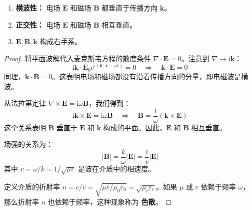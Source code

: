 \documentclass[fontset=none]{ctexart}
\begin{document}
\begin{theorem}[平面电磁波的性质]
\begin{enumerate}
    \item \textbf{横波性：} 电场 $\bm{E}$ 和磁场 $\bm{B}$ 都垂直于传播方向 $\bm{k}$。
    \item \textbf{正交性：} 电场 $\bm{E}$ 和磁场 $\bm{B}$ 相互垂直。
    \item $\bm{E}, \bm{B}, \bm{k}$ 构成右手系。
\end{enumerate}
\end{theorem}
\begin{proof}
将平面波解代入麦克斯韦方程的散度条件 $\nabla \cdot \bm{E}=0$。注意到 $\nabla \to \mathrm{i}\bm{k}$：
\begin{equation}
\mathrm{i}\bm{k} \cdot \bm{E}_0 \mathrm{e}^{\mathrm{i}(\bm{k} \cdot \bm{r} - \omega t)} = 0 \quad \Rightarrow \quad \bm{k} \cdot \bm{E} = 0
\end{equation}
同理，$\bm{k} \cdot \bm{B} = 0$。这表明电场和磁场都没有沿着传播方向的分量，即电磁波是横波。

从法拉第定律 $\nabla \times \bm{E} = \mathrm{i}\omega\bm{B}$，我们得到：
\begin{equation}
\mathrm{i}\bm{k} \times \bm{E} = \mathrm{i}\omega\bm{B} \quad \Rightarrow \quad \bm{B} = \frac{1}{\omega}(\bm{k} \times \bm{E})
\end{equation}
这个关系表明 $\bm{B}$ 垂直于 $\bm{E}$ 和 $\bm{k}$ 构成的平面。因此，$\bm{E}$ 和 $\bm{B}$ 相互垂直。

场强的关系为：
\begin{equation}
|\bm{B}| = \frac{k}{\omega} |\bm{E}| = \frac{1}{v} |\bm{E}|
\end{equation}
其中 $v = \omega/k = 1/\sqrt{\mu\varepsilon}$ 是波在介质中的相速度。

定义介质的折射率 $n = c/v = \sqrt{\mu\varepsilon/\mu_0\varepsilon_0} = \sqrt{\mu_r \varepsilon_r}$。如果 $\mu$ 或 $\varepsilon$ 依赖于频率 $\omega$，那么折射率 $n$ 也依赖于频率，这种现象称为 \textbf{色散}。
\end{proof}
\end{document}
